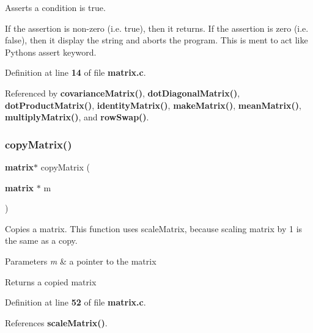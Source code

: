 Asserts a condition is true. 

If the assertion is non-\/zero (i.\+e. true), then it returns. If the assertion is zero (i.\+e. false), then it display the string and aborts the program. This is ment to act like Python\textquotesingle{}s assert keyword. 

Definition at line \textbf{ 14} of file \textbf{ matrix.\+c}.



Referenced by \textbf{ covariance\+Matrix()}, \textbf{ dot\+Diagonal\+Matrix()}, \textbf{ dot\+Product\+Matrix()}, \textbf{ identity\+Matrix()}, \textbf{ make\+Matrix()}, \textbf{ mean\+Matrix()}, \textbf{ multiply\+Matrix()}, and \textbf{ row\+Swap()}.


\mbox{\label{matrix_8h_abbb8d2d20c2dd53a2269d017a336668f}} 
\subsubsection{copy\+Matrix()}
{\footnotesize\ttfamily \textbf{ matrix}$\ast$ copy\+Matrix (\begin{DoxyParamCaption}\item[{\textbf{ matrix} $\ast$}]{m }\end{DoxyParamCaption})}



Copies a matrix. This function uses scale\+Matrix, because scaling matrix by 1 is the same as a copy. 


\begin{DoxyParams}{Parameters}
{\em m} & a pointer to the matrix \\
\hline
\end{DoxyParams}
\begin{DoxyReturn}{Returns}
a copied matrix 
\end{DoxyReturn}


Definition at line \textbf{ 52} of file \textbf{ matrix.\+c}.



References \textbf{ scale\+Matrix()}.


